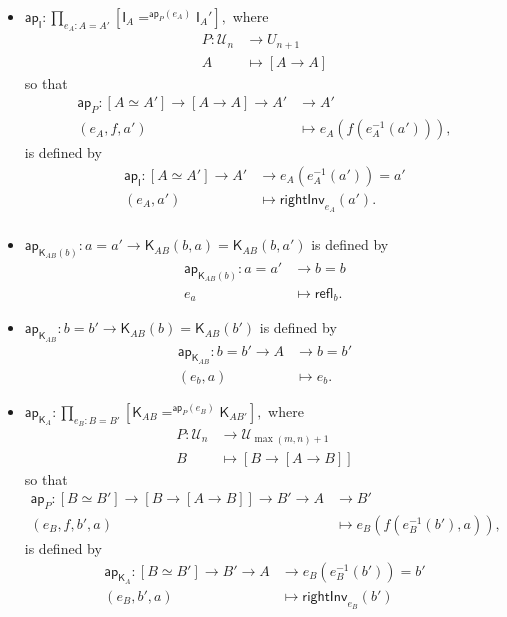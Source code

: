 \documentclass[a4paper]{article}
\theoremstyle{definition}
\theoremstyle{remark}
\let\defeq\equiv
\renewcommand{\equiv}{\simeq}
\newcommand{\pathOver}[1]{=^{#1}}
\newcommand{\univVar}{\mathcal}
\newcommand{\U}{\univVar{U}}
\newcommand{\0}{\primType{0}}
\newcommand{\1}{\primType{1}}
\newcommand{\2}{\primType{2}}
\newcommand{\nm}{\mathsf}
\newcommand{\refl}{\nm{refl}}
\newcommand{\ap}{\nm{ap}}
\newcommand{\combinator}{\nm}
\newcommand{\idFun}{\combinator{I}}
\newcommand{\constFun}{\combinator{K}}
\newcommand{\rightInv}{\nm{rightInv}}
\begin{document}
\begin{itemize}
  \item $\ap_\idFun : \prod_{e_A : A = A'} [\idFun_A \pathOver{\ap_P(e_A)} \idFun_A'],$
  where
  \begin{align*}
    P : \U_n &\to     U_{n+1}\\
        A    &\mapsto [A \to A]
  \end{align*}
  so that
  \begin{align*}
    \ap_P : [A \equiv A'] \to [A \to A] \to A' &\to     A'\\
            (e_A,f,a')                         &\mapsto e_A(f(e_A^{-1}(a'))),
  \end{align*}
  is defined by
  \begin{align*}
    \ap_\idFun : [A \equiv A'] \to A' &\to     e_A(e_A^{-1}(a')) = a'\\
                 (e_A,a')             &\mapsto \rightInv_{e_A}(a').\\
  \end{align*}

  \item $\ap_{\constFun_{AB}(b)} : a = a' \to \constFun_{AB}(b,a) = \constFun_{AB}(b,a')$ is
  defined by
  \begin{align*}
    \ap_{\constFun_{AB}(b)} : a = a' &\to     b = b\\
                              e_a    &\mapsto \refl_b.
  \end{align*}

  \item $\ap_{\constFun_{AB}} : b = b' \to \constFun_{AB}(b) = \constFun_{AB}(b')$ is
  defined by
  \begin{align*}
    \ap_{\constFun_{AB}} : b = b' \to A &\to     b = b'\\
                           (e_b,a)      &\mapsto e_b.
  \end{align*}

  \item $\ap_{\constFun_A} : \prod_{e_B : B = B'} [\constFun_{AB} \pathOver{\ap_P(e_B)} \constFun_{AB'}],$
  where
  \begin{align*}
    P : \U_n &\to     \U_{\max(m,n)+1}\\
        B    &\mapsto [B \to [A \to B]]
  \end{align*}
  so that
  \begin{align*}
    \ap_P : [B \equiv B'] \to [B \to [A \to B]] \to B' \to A &\to     B'\\
            (e_B,f,b',a)                                     &\mapsto e_B(f(e_B^{-1}(b'),a)),
  \end{align*}
  is defined by
  \begin{align*}
    \ap_{\constFun_A} : [B \equiv B'] \to B' \to A &\to     e_B(e_B^{-1}(b')) = b'\\
                        (e_B,b',a)                 &\mapsto \rightInv_{e_B}(b')\\
  \end{align*}


\end{itemize}
\end{document}
